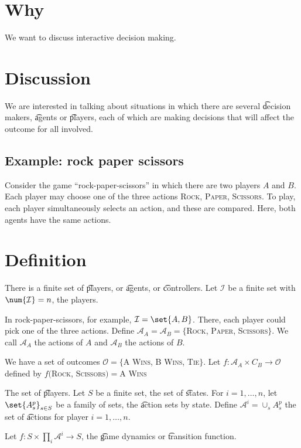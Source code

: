 

\section*{Why}

We want to discuss interactive decision making.

\section*{Discussion}

We are interested in talking about situations in which there are several \t{decision makers}, \t{agents} or \t{players}, each of which are making decisions that will affect the outcome for all involved.

\subsection*{Example: rock paper scissors}

Consider the game ``rock-paper-scissors'' in which there are two players $A$ and $B$.
Each player may choose one of the three actions \textsc{Rock}, \textsc{Paper}, \textsc{Scissors}.
To play, each player simultaneously selects an action, and these are compared.
Here, both agents have the same actions.

\section*{Definition}

There is a finite set of \t{players}, or \t{agents}, or \t{controllers}.
Let $\mathcal{I} $ be a finite set with $\num{\mathcal{I} } = n$, the players.

In rock-paper-scissors, for example, $\mathcal{I}  = \set{A, B}$.
There, each player could pick one of the three actions.
Define $\mathcal{A} _A = \mathcal{A} _B = \{$\textsc{Rock}, \textsc{Paper}, \textsc{Scissors}$\}$.
We call $\mathcal{A} _A$ the actions of $A$ and $\mathcal{A} _B$ the actions of $B$.

We have a set of outcomes $\mathcal{O} = \{$\textsc{A Wins}, \textsc{B Wins}, \textsc{Tie}$\}$.
Let $f: \mathcal{A} _A \times C_B \to \mathcal{O}$ defined by $f($\textsc{Rock}, \textsc{Scissors}$) = $\textsc{A Wins}

The set of \t{players}.
Let $S$ be a finite set, the set of \t{states}.
For $i = 1, \dots , n$, let $\set{A^p_s}_{s \in S}$ be a family of sets, the \t{action sets by state}.
Define $\mathcal{A} ^i = \cup_s A^p_s$ the set of \t{actions} for player $i = 1, \dots , n$.

Let $f: S \times  \prod_{i} \mathcal{A} ^i \to S$, the \t{game dynamics} or \t{transition function}.

\blankpage